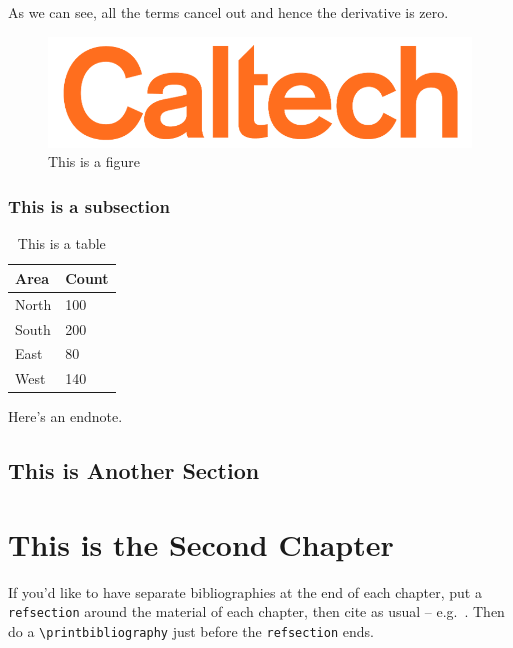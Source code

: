\documentclass[12pt]{caltech_thesis}
\begin{document}
As we can see, all the terms cancel out and hence the derivative is zero.
\begin{figure}[hbt!]
\centering
\includegraphics[width=.3\textwidth]{caltech.png}
\caption{This is a figure}\label{fig:logo}
\end{figure}

\subsection{This is a subsection}

\begin{table}[hbt!]
\centering
\begin{tabular}{ll}
\hline
Area & Count\\
\hline
North & 100\\
South & 200\\
East & 80\\
West & 140\\
\hline
\end{tabular}
\caption{This is a table}\label{tab:sample}
\end{table}

\lipsum[3] 

\lipsum[4-5] 

Here's an endnote.

\section{This is Another Section}
\lipsum[6-7] 

\chapter{This is the Second Chapter}
\begin{refsection}
If you'd like to have separate bibliographies at the end of each chapter, put a \verb|refsection| around the material of each chapter, then cite as usual -- e.g.~\citep{GMP81,Ful83}. Then do a \verb|\printbibliography| just before the \verb|refsection| ends. 

\printbibliography[heading=subbibliography]
\end{refsection}
\end{document}
